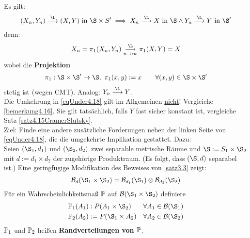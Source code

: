 Es gilt:
\begin{align}\label{eqUnder4.18}
(X_n,Y_n)\stackrel{\L}{\longrightarrow}(X,Y)\text { in }\S\times S'
\implies X_n\stackrel{\L}{\longrightarrow} X\text{ in }\S\wedge
Y_n\stackrel{\L}{\longrightarrow} Y\text{ in }\S'
\end{align}
denn:
\begin{align*}
X_n=\pi_1(X_n,Y_n)\stackrelnew{n\to\infty}{\L}{\longrightarrow}\pi_1(X,Y)=X
\end{align*}
wobei die \textbf{Projektion}
\begin{align*}
\pi_1:\S\times\S'\to\S,~\pi_1(x,y):=x\qquad\forall (x,y)\in\S\times\S'
\end{align*}
stetig ist (wegen CMT). Analog: $Y_n\stackrel{\L}{\longrightarrow} Y$.\\
Die Umkehrung in \eqref{eqUnder4.18} gilt im Allgemeinen \underline{nicht}! Vergleiche \ref{bemerkung4.16}. Sie gilt tatsächlich, falls $Y$ fast sicher konstant ist, vergleiche Satz \ref{satz4.15CramerSlutsky}.\\
Ziel: Finde eine andere zusätzliche Forderungen neben der linken Seite von \eqref{eqUnder4.18}, die die umgekehrte Implikation gestattet. Dazu:\\
Seien $(\S_1,d_1)$ und $(\S_2,d_2)$ zwei separable metrische Räume und $\S:=S_1\times\S_2$ mit $d:=d_1\times d_2$ der zugehörige Produktraum. (Es folgt, dass $(\S,d)$ separabel ist.) Eine geringfügige Modifikation  des Beweises von \ref{satz3.3} zeigt:
\begin{align*}
\B_d(\S_1\times\S_2)=\B_{d_1}(\S_1)\otimes\B_{d_2}(\S_2)
\end{align*}
Für ein Wahrscheinlichkeitsmaß $\P$ auf $\B(\S_1\times\S_2)$ definiere 
\begin{align*}
\P_1(A_1)&:P(A_1\times\S_2) &\forall A_1\in\B(\S_1)\\
\P_2(A_2)&:=P(\S_1\times A_2) &\forall A_2\in\B(\S_2)
\end{align*}
$\P_1$ und $\P_2$ heißen \textbf{Randverteilungen von $\P$}.

